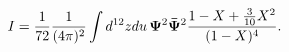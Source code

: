 \begin{equation}\label{59}
I={1\over 72}{1\over (4\pi)^{2}}\int d^{12}z du\,{\bf
\Psi}^{2}{\bf \bar\Psi}^{2}{1-X+{3\over10}X^2\over(1-X)^4}.
\end{equation}

